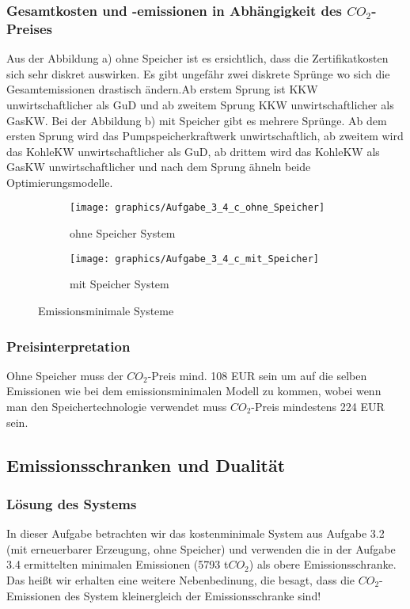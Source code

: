 \documentclass{eegreport}
\begin{document}
\subsubsection{Gesamtkosten und -emissionen in Abhängigkeit des $CO_2$-Preises}
Aus der Abbildung a) ohne Speicher ist es ersichtlich, dass die Zertifikatkosten sich sehr diskret auswirken. Es gibt ungefähr zwei diskrete Sprünge wo sich die Gesamtemissionen drastisch ändern.Ab erstem Sprung ist KKW unwirtschaftlicher als GuD und ab zweitem Sprung KKW unwirtschaftlicher als GasKW. Bei der Abbildung b) mit Speicher gibt es mehrere Sprünge. Ab dem ersten Sprung wird das Pumpspeicherkraftwerk unwirtschaftlich, ab zweitem wird das KohleKW unwirtschaftlicher als GuD, ab drittem wird das KohleKW als GasKW unwirtschaftlicher und nach dem Sprung ähneln beide Optimierungsmodelle. 

\begin{figure}
\begin{subfigure}{.5\textwidth}
  \centering
  \texttt{[image: graphics/Aufgabe\_3\_4\_c\_ohne\_Speicher]}
  \caption{ohne Speicher System}
  \label{fig:sfig2}
\end{subfigure}%
\begin{subfigure}{.5\textwidth}
  \centering
  \texttt{[image: graphics/Aufgabe\_3\_4\_c\_mit\_Speicher]}
  \caption{mit Speicher System}
  \label{fig:sfig1}
\end{subfigure}
\caption{Emissionsminimale Systeme}
\label{fig:1}
\end{figure}

\subsubsection{Preisinterpretation}
Ohne Speicher muss der $CO_2$-Preis mind. 108 EUR sein um auf die selben Emissionen wie bei dem emissionsminimalen Modell zu kommen, wobei wenn man den Speichertechnologie verwendet muss $CO_2$-Preis mindestens 224 EUR sein.

\newpage
\subsection{Emissionsschranken und Dualität}

\subsubsection{Lösung des Systems}
In dieser Aufgabe betrachten wir das kostenminimale System aus Aufgabe 3.2 (mit erneuerbarer Erzeugung, ohne Speicher) und verwenden die in der Aufgabe 3.4 ermittelten minimalen Emissionen (5793 t$CO_2$) als obere Emissionsschranke. Das heißt wir erhalten eine weitere Nebenbedinung, die besagt, dass die $CO_2$-Emissionen des System kleinergleich der Emissionsschranke sind!\\
\end{document}

